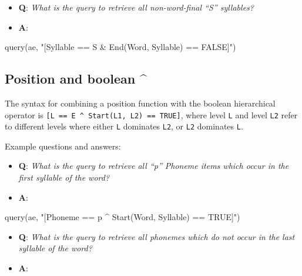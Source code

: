 \documentclass[
]{book}
\newenvironment{Shaded}{\begin{snugshade}}{\end{snugshade}}
\newcommand{\FunctionTok}[1]{\textcolor[rgb]{0.00,0.00,0.00}{#1}}
\newcommand{\NormalTok}[1]{#1}
\newcommand{\StringTok}[1]{\textcolor[rgb]{0.31,0.60,0.02}{#1}}
\providecommand{\tightlist}{%
  \setlength{\itemsep}{0pt}\setlength{\parskip}{0pt}}
\begin{document}
\begin{itemize}
\tightlist
\item
  \textbf{Q}: \emph{What is the query to retrieve all non-word-final ``S'' syllables?}
\item
  \textbf{A}:
\end{itemize}

\begin{Shaded}
\begin{Highlighting}[]
\FunctionTok{query}\NormalTok{(ae, }\StringTok{"[Syllable == S \& End(Word, Syllable) == FALSE]"}\NormalTok{)}
\end{Highlighting}
\end{Shaded}

\hypertarget{position-and-boolean-1}{%
\subsection{Position and boolean \^{}}\label{position-and-boolean-1}}

The syntax for combining a position function with the boolean hierarchical operator is \texttt{{[}L\ ==\ E\ \^{}\ Start(L1,\ L2)\ ==\ TRUE{]}}, where level \texttt{L} and level \texttt{L2} refer to different levels where either \texttt{L} dominates \texttt{L2}, or \texttt{L2} dominates \texttt{L}.

Example questions and answers:

\begin{itemize}
\tightlist
\item
  \textbf{Q}: \emph{What is the query to retrieve all ``p'' Phoneme items which occur in the first syllable of the word?}
\item
  \textbf{A}:
\end{itemize}

\begin{Shaded}
\begin{Highlighting}[]
\FunctionTok{query}\NormalTok{(ae, }\StringTok{"[Phoneme == p \^{} Start(Word, Syllable) == TRUE]"}\NormalTok{)}
\end{Highlighting}
\end{Shaded}

\begin{itemize}
\tightlist
\item
  \textbf{Q}: \emph{What is the query to retrieve all phonemes which do not occur in the last syllable of the word?}
\item
  \textbf{A}:
\end{itemize}
\end{document}

